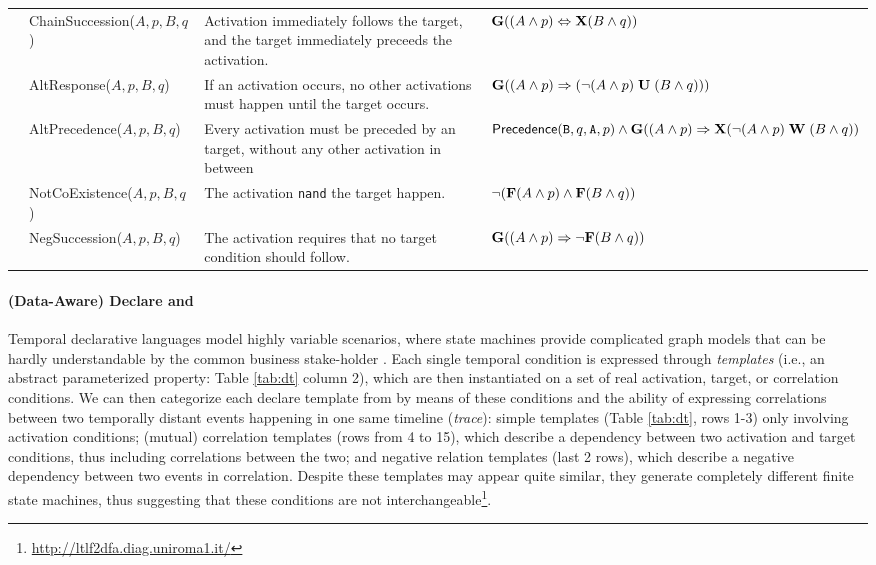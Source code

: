 \begin{table}
{\begin{tabular}{c|l|p{9cm}|l}
	 & \textsf{ChainSuccession($A,p,B,q$) }  & Activation immediately follows the target, and the target immediately preceeds the activation. & $\mathbf{G}((A\wedge p)\Leftrightarrow\mathbf{X}(B\wedge q))$\\
	 & \textsf{AltResponse($A,p,B,q$) }  & If an activation occurs, no other activations must happen until the target occurs.  & $\mathbf{G}((A\wedge p)\Rightarrow({\neg(A\wedge p)}\;\mathbf{U}\;{(B\wedge q)}))$\\
	 & \textsf{AltPrecedence($A,p,B,q$) }  & Every activation must be preceded by an target, without any other
	 activation in between &   $\textsf{Precedence}(\texttt{B},q,\texttt{A},p)\wedge \mathbf{G}((A\wedge p)\Rightarrow \mathbf{X}({\neg(A\wedge p)}\;\mathbf{W}\;{(B\wedge q)})$\\
	 \midrule
	 
	 \parbox[t]{2mm}{} & \textsf{NotCoExistence($A,p,B,q$) } & The activation \texttt{nand} the target happen.&  $\neg(\mathbf{F}(A\wedge p)\wedge\mathbf{F}(B\wedge q))$\\
	 & \textsf{NegSuccession($A,p,B,q$)} & The activation requires that no target condition should follow.& $\mathbf{G}((A\wedge p)\Rightarrow \neg\mathbf{F}(B\wedge q))$ \\
	 \bottomrule
\end{tabular}}
\end{table}



\paragraph*{(Data-Aware) Declare and \LTLf}\label{sec:DAD} Temporal declarative languages model highly variable scenarios, where state machines provide complicated graph models that can be hardly understandable by the common business stake-holder \cite{PichlerWZPMR11}. Each single temporal condition is expressed through \textit{templates} (i.e., an abstract parameterized property: Table \ref{tab:dt} column 2), which are then instantiated on a set of real activation, target, or correlation conditions. We can then categorize each declare template from \cite{Li2020} by means of these conditions and the ability of expressing correlations between two temporally distant events happening in one same timeline (\textit{trace}): simple
 templates (Table \ref{tab:dt}, rows 1-3) only involving activation conditions; (mutual)
 correlation templates (rows from 4 to 15), which describe a dependency between two
activation and target conditions, thus including correlations between the two; and negative relation templates (last 2 rows), which describe a negative
dependency between two events in correlation. %
Despite %
these templates may appear quite similar, they generate completely different finite state machines, thus suggesting that these conditions are not interchangeable\footnote{\url{http://ltlf2dfa.diag.uniroma1.it/}}. 

